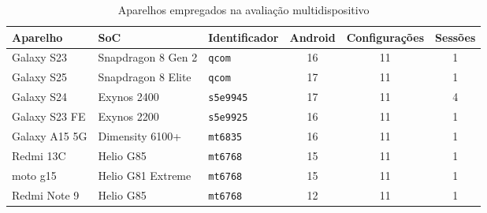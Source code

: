 \begin{table}[H]
\centering
\small
\caption{Aparelhos empregados na avaliação multidispositivo}
\label{tab:aparelhos}
\begin{tabular}{lllccc}
\toprule
\textbf{Aparelho} & \textbf{\ac{SoC}} & \textbf{Identificador} &
\textbf{Android} & \textbf{Configurações} & \textbf{Sessões} \\
\midrule
Galaxy S23 & Snapdragon 8 Gen 2 & \texttt{qcom} & 16 & 11 & 1 \\
Galaxy S25 & Snapdragon 8 Elite & \texttt{qcom} & 17 & 11 & 1 \\
Galaxy S24 & Exynos 2400 & \texttt{s5e9945} & 17 & 11 & 4 \\
Galaxy S23 FE & Exynos 2200 & \texttt{s5e9925} & 16 & 11 & 1 \\
Galaxy A15 5G & Dimensity 6100+ & \texttt{mt6835} & 16 & 11 & 1 \\
Redmi 13C & Helio G85 & \texttt{mt6768} & 15 & 11 & 1 \\
moto g15 & Helio G81 Extreme & \texttt{mt6768} & 15 & 11 & 1 \\
Redmi Note 9 & Helio G85 & \texttt{mt6768} & 12 & 11 & 1 \\
\bottomrule
\end{tabular}
\end{table}
